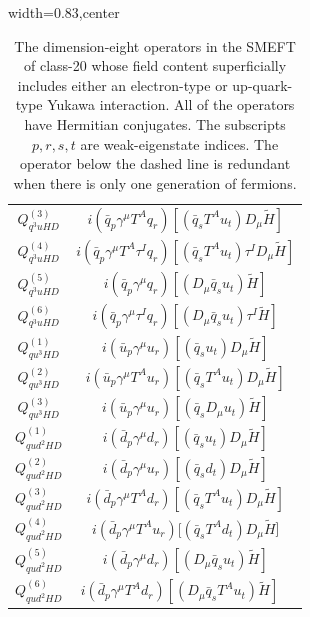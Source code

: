 \begin{table}[H]
\begin{center}
\begin{adjustbox}{width=0.83\textwidth,center}
\begin{minipage}[t]{6.1cm}
\begin{tabular}[t]{c|c}
%
$Q_{q^3uHD}^{(3)}$  &  $i (\bar q_p \gamma^\mu T^A q_r) [(\bar q_s T^A u_t) D_\mu \widetilde H]$ \\
%
$Q_{q^3uHD}^{(4)}$  &  $i (\bar q_p \gamma^\mu T^A \tau^I q_r) [(\bar q_s T^A u_t) \tau^I D_\mu \widetilde H]$ \\
%
$Q_{q^3uHD}^{(5)}$  &  $i (\bar q_p \gamma^\mu q_r) [(D_\mu \bar q_s u_t) \widetilde H]$ \\
%
$Q_{q^3uHD}^{(6)}$  &  $i (\bar q_p \gamma^\mu \tau^I q_r) [(D_\mu \bar q_s u_t) \tau^I  \widetilde H]$ \\
%
$Q_{qu^3HD}^{(1)}$  &  $i (\bar u_p \gamma^\mu u_r) [(\bar q_s u_t) D_\mu \widetilde H]$ \\
%
$Q_{qu^3HD}^{(2)}$  &  $i (\bar u_p \gamma^\mu T^A u_r) [(\bar q_s T^A u_t) D_\mu \widetilde H]$ \\
%
$Q_{qu^3HD}^{(3)}$  &  $i (\bar u_p \gamma^\mu u_r) [(\bar q_s  D_\mu u_t) \widetilde H]$ \\
%
$Q_{qud^2HD}^{(1)}$  &  $i (\bar d_p \gamma^\mu d_r) [(\bar q_s u_t) D_\mu \widetilde H]$ \\
%
$Q_{qud^2HD}^{(2)}$  &  $i (\bar d_p \gamma^\mu u_r) [(\bar q_s d_t) D_\mu \widetilde H]$ \\
%
$Q_{qud^2HD}^{(3)}$  &  $i (\bar d_p \gamma^\mu T^A d_r) [(\bar q_s T^A u_t) D_\mu \widetilde H]$ \\
%
$Q_{qud^2HD}^{(4)}$  &  $i (\bar d_p \gamma^\mu T^A u_r) [(\bar q_s T^A d_t)  D_\mu \widetilde H$] \\
%
$Q_{qud^2HD}^{(5)}$  &  $i (\bar d_p \gamma^\mu d_r) [(D_\mu \bar q_s u_t) \widetilde H]$ \\
%
$Q_{qud^2HD}^{(6)}$  &  $i (\bar d_p \gamma^\mu T^A d_r) [(D_\mu \bar q_s T^A u_t) \widetilde H]$ \
\end{tabular}
\end{minipage}
\end{adjustbox}
\end{center}
\caption{The dimension-eight operators in the SMEFT of class-20 whose field content superficially includes either an electron-type or up-quark-type Yukawa interaction.  
All of the operators have Hermitian conjugates. 
The subscripts $p, r, s, t$ are weak-eigenstate indices.
The operator below the dashed line is redundant when there is only one generation of fermions.}
\label{tab:smeft8class_20_le_qu}
\end{table}


